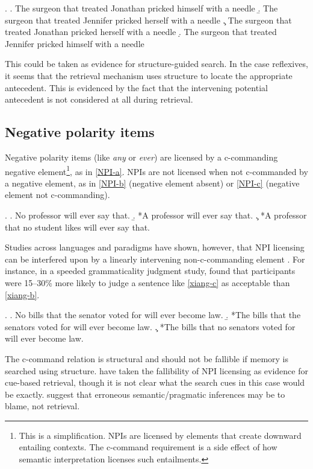 \documentclass[12pt,letterpaper]{article}
\begin{document}
\ex. \label{sturt-sents} \a. The surgeon that treated Jonathan pricked himself with a needle \label{sturt-a}
      \b. The surgeon that treated Jennifer pricked herself with a needle \label{sturt-b}
      \c. The surgeon that treated Jonathan pricked herself with a needle \label{sturt-c}
      \d. The surgeon that treated Jennifer pricked himself with a needle \label{sturt-d}


This could be taken as evidence for structure-guided search. In the case reflexives, it seems that the retrieval mechanism uses structure to locate the appropriate antecedent. This is evidenced by the fact that the intervening potential antecedent is not considered at all during retrieval.


\subsection{Negative polarity items}

Negative polarity items (like \emph{any} or \emph{ever}) are licensed by a c-commanding negative element\footnote{This is a simplification. NPIs are licensed by elements that create downward entailing contexts. The c-command requirement is a side effect of how semantic interpretation licenses such entailments.}, as in \ref{NPI-a}. NPIs are not licensed when not c-commanded by a negative element, as in \ref{NPI-b} (negative element absent) or \ref{NPI-c} (negative element not c-commanding).

\ex. \a. No professor will ever say that. \label{NPI-a}
     \b. *A professor will ever say that. \label{NPI-b}
     \c. *A professor that no student likes will ever say that. \label{NPI-c}


Studies across languages and paradigms have shown, however, that NPI licensing can be interfered upon by a linearly intervening non-c-commanding element \citep[][et seq.]{drenhaus05}. For instance, in a speeded grammaticality judgment study, \citet{xiang06} found that participants were 15--30\% more likely to judge a sentence like \ref{xiang-c} as acceptable than \ref{xiang-b}.

\ex. \a. No bills that the senator voted for will ever become law.    \label{xiang-a}
     \b. *The bills that the senators voted for will ever become law. \label{xiang-b}
     \c. *The bills that no senators voted for will ever become law.  \label{xiang-c}


The c-command relation is structural and should not be fallible if memory is searched using structure. \citet{vasishth08} have taken the fallibility of NPI licensing as evidence for cue-based retrieval, though it is not clear what the search cues in this case would be exactly. \citet{xiang09} suggest that erroneous semantic/pragmatic inferences may be to blame, not retrieval.
\end{document}
